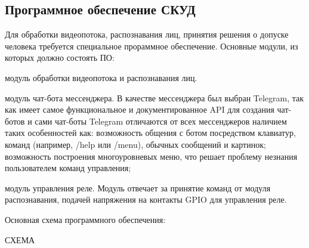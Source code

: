 \subsection{Программное обеспечение СКУД}

Для обработки видеопотока, распознавания лиц, принятия решения о допуске человека требуется специальное прораммное обеспечение. Основные модули, из которых должно состоять ПО:

\begin{itemize*}
\item модуль обработки видеопотока и распознавания лиц.
\item модуль чат-бота мессенджера. В качестве мессенджера был выбран Telegram, так как имеет самое функциональное и документированное API для создания чат-ботов и сами чат-боты Telegram отличаются от всех мессенджеров наличием таких особенностей как: возможность общения с ботом посредством клавиатур, команд (например, /help или /menu), обычных сообщений и картинок; возможность построения многоуровневых меню, что решает проблему незнания пользователем команд управления;
\item модуль управления реле. Модуль отвечает за принятие команд от модуля распознавания, подачей напряжения на контакты GPIO для управления реле.
\end{itemize*}

Основная схема программного обеспечения:

СХЕМА
